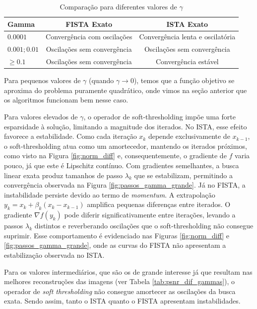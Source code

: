 \documentclass[12pt]{article}
\begin{document}
\begin{table}[H]
    \centering
    \caption{Comparação para diferentes valores de $\gamma$}
    \label{tab:dif_gammas}
    \begin{tabular}{lcc}
        \toprule
        \textbf{Gamma} & \textbf{FISTA Exato} & \textbf{ISTA Exato} \\
        \midrule
        $0.0001$ & Convergência com oscilações & Convergência lenta e oscilatória\\
        $0.001; 0.01$ & Oscilações sem convergência & Oscilações sem convergência \\
        $\geq 0.1$ & Oscilações sem convergência & Convergência estável\\
        \bottomrule
    \end{tabular}
\end{table}

Para pequenos valores de $\gamma$ (quando $\gamma \to 0$), temos que a função objetivo se aproxima do problema puramente quadrático, onde vimos na seção anterior que os algoritmos funcionam bem nesse caso.

Para valores elevados de $\gamma$, o operador de soft-thresholding impõe uma forte esparsidade à solução, limitando a magnitude dos iterados. No ISTA, esse efeito favorece a estabilidade. Como cada iteração $x_k$ depende exclusivamente de $x_{k-1}$, o soft-thresholding atua como um amortecedor, mantendo os iterados próximos, como visto na Figura \ref{fig:norm_diff} e, consequentemente, o gradiente de $f$ varia pouco, já que este é Lipschitz contínuo. Com gradientes semelhantes, a busca linear exata produz tamanhos de passo $\lambda_k$ que se estabilizam, permitindo a convergência observada na Figura \ref{fig:passos_gamma_grande}. Já no FISTA, a instabilidade persiste devido ao termo de \textit{momentum}. A extrapolação $y_k = x_k + \beta_k(x_k - x_{k-1})$ amplifica pequenas diferenças entre iterados. O gradiente $\nabla f(y_k)$ pode diferir significativamente entre iterações, levando a passos $\lambda_k$ distintos e reverberando oscilações que o soft-thresholding não consegue suprimir. Esse comportamento é evidenciado nas Figuras \ref{fig:norm_diff} e \ref{fig:passos_gamma_grande}, onde as curvas do FISTA não apresentam a estabilização observada no ISTA.

Para os valores intermediários, que são os de grande interesse já que resultam nas melhores reconstruções das imagens (ver Tabela \ref{tab:psnr_dif_gammas}), o operador de \textit{soft thresholding} não consegue amortecer as oscilações da busca exata. Sendo assim, tanto o ISTA quanto o FISTA apresentam instabilidades.
\end{document}
